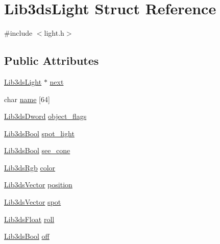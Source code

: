 \hypertarget{struct_lib3ds_light}{\section{Lib3ds\-Light Struct Reference}
\label{struct_lib3ds_light}
}


{\ttfamily \#include $<$light.\-h$>$}

\subsection*{Public Attributes}
\begin{DoxyCompactItemize}
\item 
\hyperlink{struct_lib3ds_light}{Lib3ds\-Light} $\ast$ \hyperlink{struct_lib3ds_light_a329c01bf27f67988d859beb5d5d238cb}{next}
\item 
char \hyperlink{struct_lib3ds_light_ab783fa9ebd6f3b7e1d850d74405d8368}{name} \mbox{[}64\mbox{]}
\item 
\hyperlink{types_8h_a299c9663303144c562f6bd92c2f273d3}{Lib3ds\-Dword} \hyperlink{struct_lib3ds_light_aec53bd863029a58e3ae33f4beafb9063}{object\-\_\-flags}
\item 
\hyperlink{types_8h_a89dd7398a9ebbbf28011f8c32df67ad3}{Lib3ds\-Bool} \hyperlink{struct_lib3ds_light_ad2b7e00fd27977ec71562c2ac3ad8665}{spot\-\_\-light}
\item 
\hyperlink{types_8h_a89dd7398a9ebbbf28011f8c32df67ad3}{Lib3ds\-Bool} \hyperlink{struct_lib3ds_light_a46465e5e804db0a2e4ee63c544eb1d2c}{see\-\_\-cone}
\item 
\hyperlink{types_8h_a7e320d64d2488320001f7f3b25168ee3}{Lib3ds\-Rgb} \hyperlink{struct_lib3ds_light_a52ce126f4d863e63ebbf073e704e532b}{color}
\item 
\hyperlink{group__vector_ga6ac1c3b3ef15381ebf6baf264d658dcf}{Lib3ds\-Vector} \hyperlink{struct_lib3ds_light_ac0ef4c675c43ac9f7a47236c7e418db6}{position}
\item 
\hyperlink{group__vector_ga6ac1c3b3ef15381ebf6baf264d658dcf}{Lib3ds\-Vector} \hyperlink{struct_lib3ds_light_a64a9beecd8b7d077f00e4c22d58f9988}{spot}
\item 
\hyperlink{types_8h_ab18e70f51f9a53c9dee8d930c8e1a7bf}{Lib3ds\-Float} \hyperlink{struct_lib3ds_light_a7827c90ab522991f41f7afbfbcbf03c9}{roll}
\item 
\hyperlink{types_8h_a89dd7398a9ebbbf28011f8c32df67ad3}{Lib3ds\-Bool} \hyperlink{struct_lib3ds_light_a5adef8a7ff6a9dd3622e6edee76e61b7}{off}
\item 

\end{DoxyCompactItemize}
